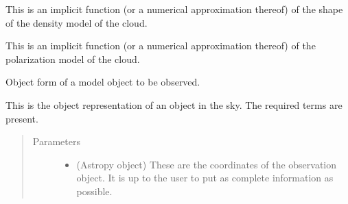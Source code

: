 \documentclass[letterpaper,10pt,english]{sphinxmanual}
\begin{document}
\begin{fulllineitems}
\begin{fulllineitems}
\end{fulllineitems}


\begin{fulllineitems}
\label{\detokenize{model_observing:model_observing.ProtostarModel.self.density_model}}
 \textendash{} This is an implicit function (or a numerical approximation thereof) of
the shape of the density model of the cloud.

\end{fulllineitems}


\begin{fulllineitems}
\label{\detokenize{model_observing:model_observing.ProtostarModel.self.polarization_model}}
 \textendash{} This is an implicit function (or a numerical approximation thereof) of
the polarization model of the cloud.

\end{fulllineitems}


\begin{fulllineitems}
\label{\detokenize{model_observing:model_observing.ProtostarModel.__init__}}
Object form of a model object to be observed.

This is the object representation of an object in the sky. The
required terms are present.
\begin{quote}\begin{description}
\item[{Parameters}] \leavevmode\begin{itemize}
\item {} 
 (Astropy  object) \textendash{} These are the coordinates of the observation object. It is up
to the user to put as complete information as possible.


\end{itemize}
\end{description}
\end{quote}
\end{fulllineitems}
\end{fulllineitems}
\end{document}
